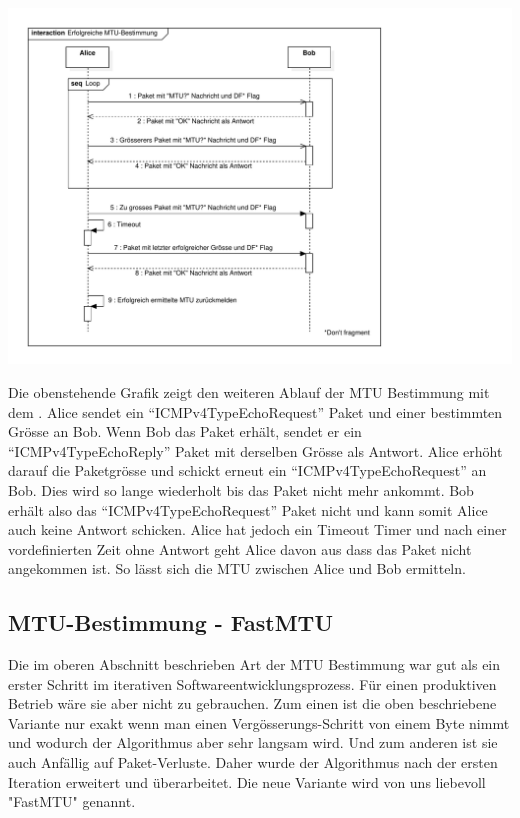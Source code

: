 \includegraphics[trim=10 10 200 10,clip,width=\textwidth]{mainpart/implementation/img/MTUBestimmungErfolgreich}


Die obenstehende Grafik zeigt den weiteren Ablauf der \acs{MTU} Bestimmung mit dem \tool. Alice sendet ein \enquote{ICMPv4TypeEchoRequest} Paket und einer bestimmten Grösse an Bob. Wenn Bob das Paket erhält, sendet er ein \enquote{ICMPv4TypeEchoReply} Paket mit derselben Grösse als Antwort. Alice erhöht darauf die Paketgrösse und schickt erneut ein \enquote{ICMPv4TypeEchoRequest} an Bob. Dies wird so lange wiederholt bis das Paket nicht mehr ankommt. Bob erhält also das \enquote{ICMPv4TypeEchoRequest} Paket nicht und kann somit Alice auch keine Antwort schicken. Alice hat jedoch ein Timeout Timer und nach einer vordefinierten Zeit ohne Antwort geht Alice davon aus dass das Paket nicht angekommen ist. So lässt sich die \acs{MTU} zwischen Alice und Bob ermitteln.

\subsection{MTU-Bestimmung - FastMTU}
Die im oberen Abschnitt beschrieben Art der \acs{MTU} Bestimmung war gut als ein erster Schritt im iterativen Softwareentwicklungsprozess. Für einen produktiven Betrieb wäre sie aber nicht zu gebrauchen. Zum einen ist die oben beschriebene Variante nur exakt wenn man einen Vergösserungs-Schritt von einem Byte nimmt und wodurch der Algorithmus aber sehr langsam wird. Und zum anderen ist sie auch Anfällig auf Paket-Verluste.
Daher wurde der Algorithmus nach der ersten Iteration erweitert und überarbeitet. Die neue Variante wird von uns liebevoll "FastMTU" genannt.

